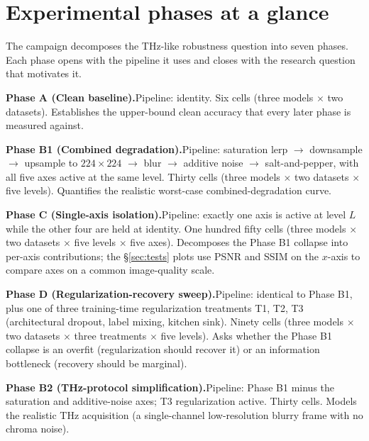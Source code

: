 \section{Experimental phases at a glance}
\label{sec:phases}

The campaign decomposes the THz-like robustness question into seven
phases. Each phase opens with the pipeline it uses and closes with the
research question that motivates it.

\textbf{Phase A (Clean baseline).}\quad Pipeline: identity. Six cells
(three models $\times$ two datasets). Establishes the upper-bound
clean accuracy that every later phase is measured against.

\textbf{Phase B1 (Combined degradation).}\quad Pipeline: saturation lerp
$\rightarrow$ downsample $\rightarrow$ upsample to $224 \times 224$
$\rightarrow$ blur $\rightarrow$ additive noise $\rightarrow$
salt-and-pepper, with all five axes active at the same level. Thirty
cells (three models $\times$ two datasets $\times$ five levels).
Quantifies the realistic worst-case combined-degradation curve.

\textbf{Phase C (Single-axis isolation).}\quad Pipeline: exactly one
axis is active at level $L$ while the other four are held at identity.
One hundred fifty cells (three models $\times$ two datasets $\times$
five levels $\times$ five axes). Decomposes the Phase B1 collapse into
per-axis contributions; the §\ref{sec:tests} plots use PSNR and SSIM
on the $x$-axis to compare axes on a common image-quality scale.

\textbf{Phase D (Regularization-recovery sweep).}\quad Pipeline:
identical to Phase B1, plus one of three training-time regularization
treatments T1, T2, T3 (architectural dropout, label mixing, kitchen
sink). Ninety cells (three models $\times$ two datasets $\times$ three
treatments $\times$ five levels). Asks whether the Phase B1 collapse
is an overfit (regularization should recover it) or an information
bottleneck (recovery should be marginal).

\textbf{Phase B2 (THz-protocol simplification).}\quad Pipeline: Phase
B1 minus the saturation and additive-noise axes; T3 regularization
active. Thirty cells. Models the realistic THz acquisition (a
single-channel low-resolution blurry frame with no chroma noise).

